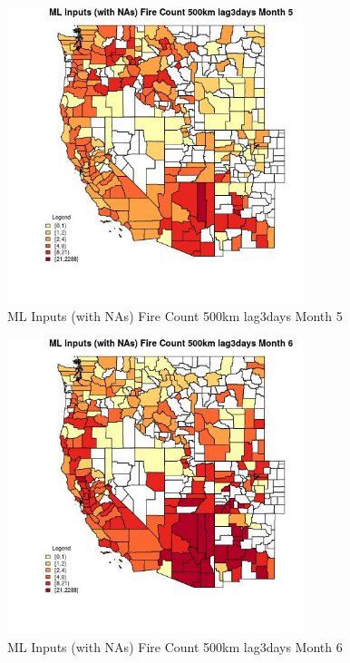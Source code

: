 \begin{figure} 
\centering  
\includegraphics[width=0.77\textwidth]{Code_Outputs/Report_ML_input_PM25_Step4_part_e_de_duplicated_aves_compiled_2019-05-21wNAs_CountyFire_Count_500km_lag3daysmedianMonth5.jpg} 
\caption{\label{fig:Report_ML_input_PM25_Step4_part_e_de_duplicated_aves_compiled_2019-05-21wNAsCountyFire_Count_500km_lag3daysmedianMonth5}ML Inputs (with NAs) Fire Count 500km lag3days Month 5} 
\end{figure} 
 

\begin{figure} 
\centering  
\includegraphics[width=0.77\textwidth]{Code_Outputs/Report_ML_input_PM25_Step4_part_e_de_duplicated_aves_compiled_2019-05-21wNAs_CountyFire_Count_500km_lag3daysmedianMonth6.jpg} 
\caption{\label{fig:Report_ML_input_PM25_Step4_part_e_de_duplicated_aves_compiled_2019-05-21wNAsCountyFire_Count_500km_lag3daysmedianMonth6}ML Inputs (with NAs) Fire Count 500km lag3days Month 6} 
\end{figure} 
 

